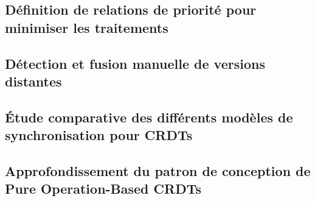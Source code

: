 \documentclass[12pt]{thesul}
\theoremstyle{definition}
\begin{document}
\subsection{Définition de relations de priorité pour minimiser les traitements}


\subsection{Détection et fusion manuelle de versions distantes}


\subsection{Étude comparative des différents modèles de synchronisation pour \acp{CRDT}}


\subsection{Approfondissement du patron de conception de Pure Operation-Based \acp{CRDT}}


% 

% 

% 

% 

% 
\end{document}
